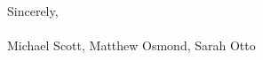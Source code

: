 \documentclass[12pt,letterpaper]{article}
\begin{document}




Sincerely, \\
\newline
\\
\indent Michael Scott, Matthew Osmond, Sarah Otto

\end{document}
